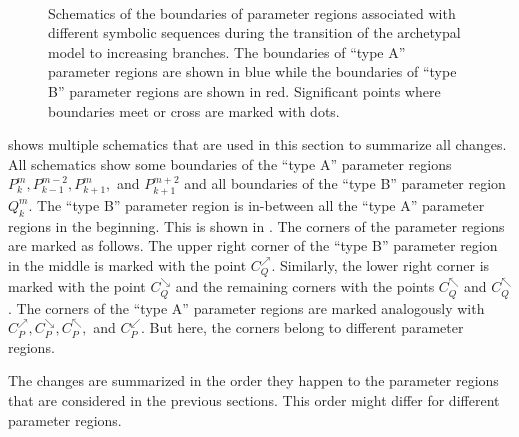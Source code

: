 \begin{figure}
{		\label{fig:add.change.schema.d}
	} \\
	\caption[Schematics of the boundaries of parameter regions associated with different symbolic sequences during the transition of the archetypal model to increasing branches]{
		Schematics of the boundaries of parameter regions associated with different symbolic sequences during the transition of the archetypal model to increasing branches.
		The boundaries of ``type A'' parameter regions are shown in blue while the boundaries of ``type B'' parameter regions are shown in red.
		Significant points where boundaries meet or cross are marked with dots.
	}
	\label{fig:add.change.schema}
\end{figure}

 shows multiple schematics that are used in this section to summarize all changes.
All schematics show some boundaries of the ``type A'' parameter regions $P^m_k, P^{m-2}_{k-1}, P^m_{k+1},$ and $P^{m+2}_{k+1}$ and all boundaries of the ``type B'' parameter region $Q^m_k$.
The ``type B'' parameter region is in-between all the ``type A'' parameter regions in the beginning.
This is shown in .
The corners of the parameter regions are marked as follows.
The upper right corner of the ``type B'' parameter region in the middle is marked with the point $C_Q^\nearrow$.
Similarly, the lower right corner is marked with the point $C_Q^\searrow$ and the remaining corners with the points $C_Q^\nwarrow$ and $C_Q^\nwarrow$.
The corners of the ``type A'' parameter regions are marked analogously with $C_P^\nearrow, C_P^\searrow, C_P^\nwarrow,$ and $C_P^\swarrow$.
But here, the corners belong to different parameter regions.

The changes are summarized in the order they happen to the parameter regions that are considered in the previous sections.
This order might differ for different parameter regions.

